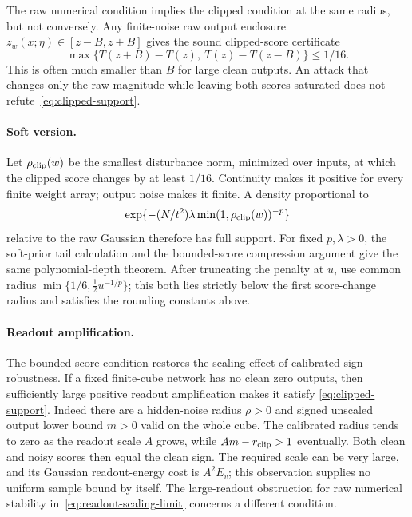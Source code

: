 The raw numerical condition implies the clipped condition at the same
radius, but not conversely. Any finite-noise raw output enclosure
$z_w(x;\eta)\in[z-B,z+B]$ gives the sound clipped-score certificate
\[
 \max\{T(z+B)-T(z),\ T(z)-T(z-B)\}\le1/16.
\]
This is often much smaller than $B$ for large clean outputs. An attack
that changes only the raw magnitude while leaving both scores saturated
does not refute~\eqref{eq:clipped-support}.

\paragraph{Soft version.}
Let $\rho_{\rm clip}(w)$ be the smallest disturbance norm, minimized over
inputs, at which the clipped score changes by at least $1/16$.
Continuity makes it positive for every finite weight array; output noise
makes it finite. A density proportional to
\[
 \exp\{-(N/t^2)\lambda\min(1,\rho_{\rm clip}(w))^{-p}\}
\]
relative to the raw Gaussian therefore has full support. For fixed
$p,\lambda>0$, the soft-prior tail calculation and the bounded-score
compression argument give the same polynomial-depth theorem. After
truncating the penalty at $u$, use common radius
$\min\{1/6,\tfrac12u^{-1/p}\}$; this both lies strictly below the first
score-change radius and satisfies the rounding constants above.

\paragraph{Readout amplification.}
The bounded-score condition restores the scaling effect of calibrated
sign robustness. If a fixed finite-cube network has no clean zero outputs,
then sufficiently large positive readout amplification makes it satisfy
\eqref{eq:clipped-support}. Indeed there are a hidden-noise radius $\rho>0$
and signed unscaled output lower bound $m>0$ valid on the whole cube.
The calibrated radius tends to zero as the readout scale $A$ grows, while
$Am-r_{\rm clip}>1$ eventually. Both clean and noisy scores then equal
the clean sign. The required scale can be very large, and its Gaussian
readout-energy cost is $A^2E_v$; this observation supplies no uniform sample
bound by itself. The large-readout obstruction for raw numerical stability
in~\eqref{eq:readout-scaling-limit} concerns a different condition.
